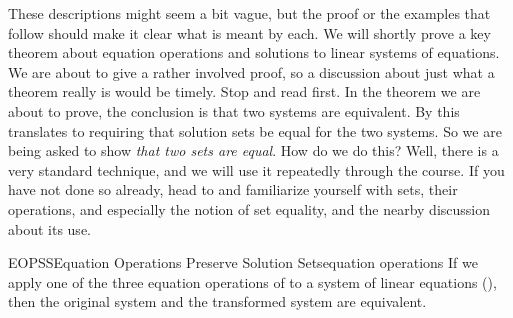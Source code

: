 %
These descriptions might seem a bit vague, but the proof or the examples that follow should make it clear what is meant by each.  We will shortly prove a key theorem about equation operations and solutions to linear systems of equations.
%
We are about to give a rather involved proof, so a discussion about just what a theorem really is would be timely.  Stop and read  first.
%
In the theorem we are about to prove, the conclusion is that two systems are equivalent.  By  this translates to requiring that solution sets be equal for the two systems.  So we are being asked to show {\em that two sets are equal}.  How do we do this?  Well, there is a very standard technique, and we will use it repeatedly through the course.  If you have not done so already, head to  and familiarize yourself with sets, their operations, and especially the notion of set equality,  and the nearby discussion about its use.\par
%
%
\begin{theorem}{EOPSS}{Equation Operations Preserve Solution Sets}{equation operations}
If we apply one of the three equation operations of  to a system of linear equations  (), then the original system and the transformed system are equivalent.
\end{theorem}
%
